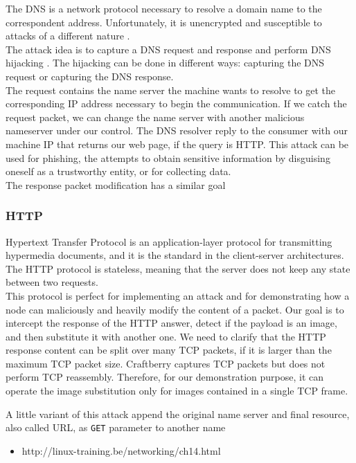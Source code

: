 \documentclass[12pt]{article}
\begin{document}
	The DNS is a network protocol necessary to resolve a domain name to the correspondent address. Unfortunately, it is unencrypted and susceptible to attacks of a different nature \cite{DNSATTACKS}.\\
	The attack idea is to capture a DNS request and response and perform DNS hijacking \cite{DNShijacking}. The hijacking can be done in different ways: capturing the DNS request or capturing the DNS response.\\
	The request contains the name server the machine wants to resolve to get the corresponding IP address necessary to begin the communication. If we catch the request packet, we can change the name server with another malicious nameserver under our control. The DNS resolver reply to the consumer with our machine IP that returns our web page, if the query is HTTP. This attack can be used for phishing, the attempts to obtain sensitive information by disguising oneself as a trustworthy entity, or for collecting data.\\
	The response packet modification has a similar goal


	\subsubsection{HTTP}

	Hypertext Transfer Protocol is an application-layer protocol for transmitting hypermedia documents, and it is the standard in the client-server architectures. The HTTP protocol is stateless, meaning that the server does not keep any state between two requests.\\
	This protocol is perfect for implementing an attack and for demonstrating how a node can maliciously and heavily modify the content of a packet. Our goal is to intercept the response of the HTTP answer, detect if the payload is an image, and then substitute it with another one. We need to clarify that the HTTP response content can be split over many TCP packets, if it is larger than the maximum TCP packet size. Craftberry captures TCP packets but does not perform TCP reassembly. Therefore, for our demonstration purpose, it can operate the image substitution only for images contained in a single TCP frame.


	A little variant of this attack append the original name server and final resource, also called URL, as \lstinline{GET} parameter to another name
	
	\begin{itemize}
		\item http://linux-training.be/networking/ch14.html
	\end{itemize}
\end{document}
